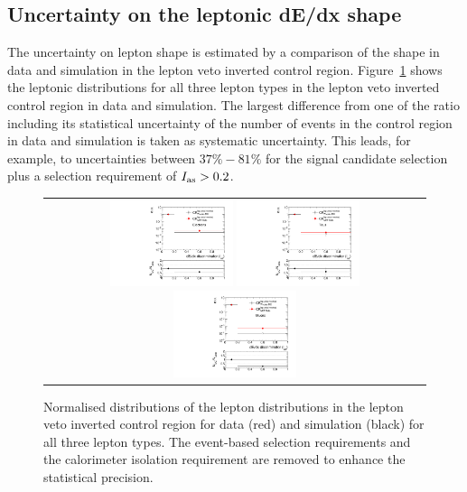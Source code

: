 \subsection{Uncertainty on the leptonic dE/dx shape}
\label{sec:LeptonIasUncertainty}

The uncertainty on lepton \ias shape is estimated by a comparison of the \ias shape in data and simulation in the lepton veto inverted control region.
Figure~\ref{fig:LeptonIasUnc} shows the leptonic \ias distributions for all three lepton types in the lepton veto inverted control region in data and simulation.
The largest difference from one of the ratio including its statistical uncertainty of the number of events in the control region in data and simulation is taken as systematic uncertainty.
This leads, for example, to uncertainties between $37\%-81\%$ for the signal candidate selection plus a selection requirement of $I_{\text{as}}>0.2$.

\begin{figure}[!h]
  \centering 
  \begin{tabular}{c}
    \includegraphics[width=0.33\textwidth]{figures/analysis/Background/hASmi_SRbinning_Electrons_MCCR_DataCR.pdf}
    \includegraphics[width=0.33\textwidth]{figures/analysis/Background/hASmi_SRbinning_Taus_MCCR_DataCR.pdf}
    \includegraphics[width=0.33\textwidth]{figures/analysis/Background/hASmi_SRbinning_Muons_MCCR_DataCR.pdf}
  \end{tabular}
  \caption{Normalised distributions of the lepton \ias distributions in the lepton veto inverted control region for data (red) and simulation (black) for all three lepton types. 
           The event-based selection requirements and the calorimeter isolation requirement are removed to enhance the statistical precision.}
  \label{fig:LeptonIasUnc}
\end{figure}

